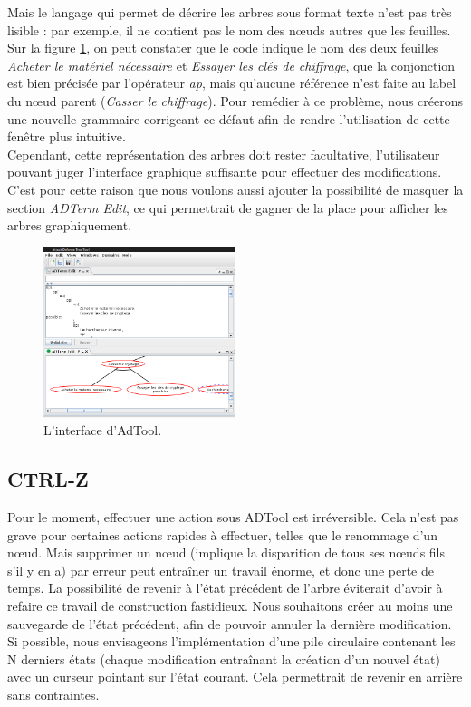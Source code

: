 		Mais le langage qui permet de décrire les arbres sous format texte n'est pas très lisible : par exemple, il ne contient pas le nom des nœuds autres que les feuilles. Sur la figure \ref{fig:int_adTool}, on peut constater que le code indique le nom des deux feuilles \textit{Acheter le matériel nécessaire} et \textit{Essayer les clés de chiffrage}, que la conjonction est bien précisée par l'opérateur \textit{ap}, mais qu'aucune référence n'est faite au label du nœud parent (\textit{Casser le chiffrage}). Pour remédier à ce problème, nous créerons une nouvelle grammaire corrigeant ce défaut afin de rendre l'utilisation de cette fenêtre plus intuitive.\\
		
		Cependant, cette représentation des arbres doit rester facultative, l'utilisateur pouvant juger l'interface graphique suffisante pour effectuer des modifications. C'est pour cette raison que nous voulons aussi ajouter la possibilité de masquer la section \emph{ADTerm Edit}, ce qui permettrait de gagner de la place pour afficher les arbres graphiquement. %

		\begin{figure}
			\centering
			\includegraphics[width=0.5\textwidth]{figure/interface_adtool.png}
			\caption{L'interface d'AdTool.}
			\label{fig:int_adTool}
		\end{figure}
	
	\subsection{CTRL-Z}	
		Pour le moment, effectuer une action sous ADTool est irréversible. Cela n'est pas grave pour certaines actions rapides à effectuer, telles que le renommage d'un nœud. Mais supprimer un nœud (implique la disparition de tous ses nœuds fils s'il y en a) par erreur peut entraîner un travail énorme, et donc une perte de temps. La possibilité de revenir à l'état précédent de l'arbre éviterait d'avoir à refaire ce travail de construction fastidieux. Nous souhaitons créer au moins une sauvegarde de l'état précédent, afin de pouvoir annuler la dernière modification. Si possible, nous envisageons l'implémentation d'une pile circulaire contenant les N derniers états (chaque modification entraînant la création d'un nouvel état) avec un curseur pointant sur l'état courant. Cela permettrait de revenir en arrière sans contraintes. %

